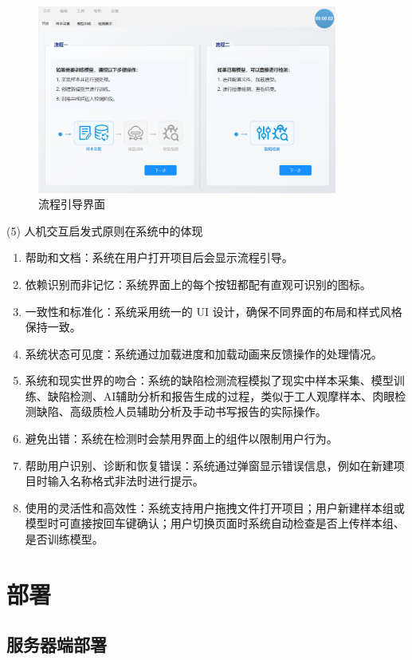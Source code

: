 \documentclass[
  ]{njuthesis}
\begin{document}
\begin{figure}[htb]
    \centering
    \includegraphics[width=0.88\textwidth]{images/流程引导界面.png}
    \caption{流程引导界面}
    \label{流程引导界面}
\end{figure}

(5) 人机交互启发式原则在系统中的体现

\begin{enumerate}
    \item 帮助和文档：系统在用户打开项目后会显示流程引导。
    \item 依赖识别而非记忆：系统界面上的每个按钮都配有直观可识别的图标。
    \item 一致性和标准化：系统采用统一的 UI 设计，确保不同界面的布局和样式风格保持一致。
    \item 系统状态可见度：系统通过加载进度和加载动画来反馈操作的处理情况。
    \item 系统和现实世界的吻合：系统的缺陷检测流程模拟了现实中样本采集、模型训练、缺陷检测、AI辅助分析和报告生成的过程，类似于工人观摩样本、肉眼检测缺陷、高级质检人员辅助分析及手动书写报告的实际操作。
    \item 避免出错：系统在检测时会禁用界面上的组件以限制用户行为。
    \item 帮助用户识别、诊断和恢复错误：系统通过弹窗显示错误信息，例如在新建项目时输入名称格式非法时进行提示。
    \item 使用的灵活性和高效性：系统支持用户拖拽文件打开项目；用户新建样本组或模型时可直接按回车键确认；用户切换页面时系统自动检查是否上传样本组、是否训练模型。
\end{enumerate}

\section{部署}

\subsection{服务器端部署}
\end{document}
